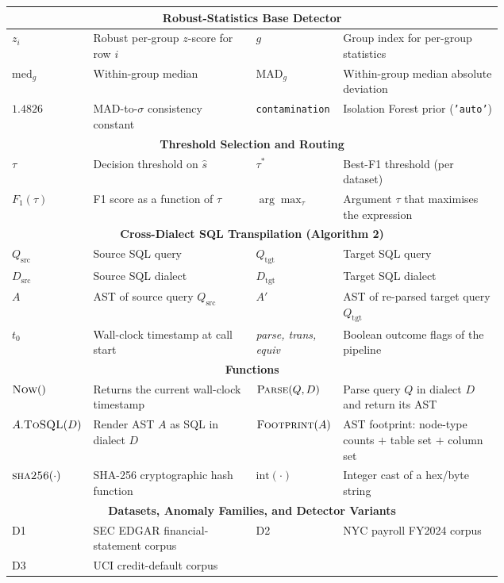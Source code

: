 \documentclass{ieeeaccess}
\begin{document}
\begin{table}[tp]
\begin{tabular}{|l|p{0.36\linewidth}||l|p{0.36\linewidth}|}
\multicolumn{4}{|c|}{\textbf{Robust-Statistics Base Detector}} \\
\hline
$z_i$ & Robust per-group $z$-score for row $i$ &
$g$ & Group index for per-group statistics \\ \hline
$\mathrm{med}_g$ & Within-group median &
$\mathrm{MAD}_g$ & Within-group median absolute deviation \\ \hline
$1.4826$ & MAD-to-$\sigma$ consistency constant &
\texttt{contamination} & Isolation Forest prior (\texttt{'auto'}) \\ \hline
\multicolumn{4}{|c|}{\textbf{Threshold Selection and Routing}} \\
\hline
$\tau$ & Decision threshold on $\hat{s}$ &
$\tau^{*}$ & Best-F1 threshold (per dataset) \\ \hline
$F_1(\tau)$ & F1 score as a function of $\tau$ &
$\arg\max_{\tau}$ & Argument $\tau$ that maximises the expression \\ \hline
\multicolumn{4}{|c|}{\textbf{Cross-Dialect SQL Transpilation (Algorithm 2)}} \\
\hline
$Q_{\mathrm{src}}$ & Source SQL query &
$Q_{\mathrm{tgt}}$ & Target SQL query \\ \hline
$D_{\mathrm{src}}$ & Source SQL dialect &
$D_{\mathrm{tgt}}$ & Target SQL dialect \\ \hline
$A$ & AST of source query $Q_{\mathrm{src}}$ &
$A'$ & AST of re-parsed target query $Q_{\mathrm{tgt}}$ \\ \hline
$t_0$ & Wall-clock timestamp at call start &
\textit{parse, trans, equiv} & Boolean outcome flags of the pipeline \\ \hline
\multicolumn{4}{|c|}{\textbf{Functions}} \\
\hline
$\textsc{Now}()$ & Returns the current wall-clock timestamp &
$\textsc{Parse}(Q,D)$ & Parse query $Q$ in dialect $D$ and return its AST \\ \hline
$A.\textsc{ToSQL}(D)$ & Render AST $A$ as SQL in dialect $D$ &
$\textsc{Footprint}(A)$ & AST footprint: node-type counts $+$ table set $+$ column set \\ \hline
$\textsc{sha256}(\cdot)$ & SHA-256 cryptographic hash function &
$\mathrm{int}(\cdot)$ & Integer cast of a hex/byte string \\ \hline
\multicolumn{4}{|c|}{\textbf{Datasets, Anomaly Families, and Detector Variants}} \\
\hline
D1 & SEC EDGAR financial-statement corpus &
D2 & NYC payroll FY2024 corpus \\ \hline
D3 & UCI credit-default corpus &

\end{tabular}
\end{table}
\end{document}
